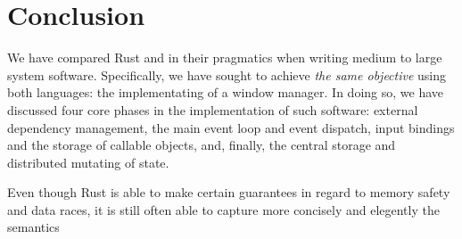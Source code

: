 \section{Conclusion}

We have compared Rust and \cpp in their pragmatics when writing medium to
large system software. Specifically, we have sought to achieve \textit{the
same objective} using both languages: the implementating of a window manager.
In doing so, we have discussed four core phases in the implementation of
such software: external dependency management, the main event loop and event
dispatch, input bindings and the storage of callable objects, and, finally, the
central storage and distributed mutating of state.

Even though Rust is able to make certain guarantees in regard to memory safety and data races, it is still often able to capture more concisely and elegently the semantics 

